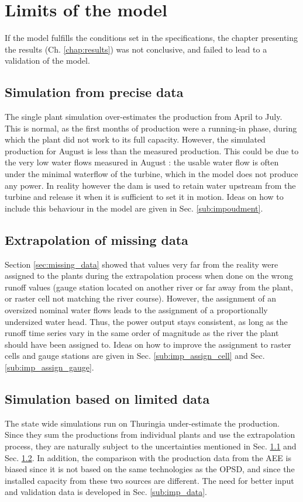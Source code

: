\section{Limits of the model}
\label{sec:limits}
If the model fulfills the conditions set in the specifications, the chapter presenting the results (Ch. \ref{chap:results}) was not conclusive, and failed to lead to a validation of the model.
\subsection{Simulation from precise data}
\label{sub:lim_single}
The single plant simulation over-estimates the production from April to July. This is normal, as the first months of production were a running-in phase, during which the plant did not work to its full capacity. However, the simulated production for August is less than the measured production. This could be due to the very low water flows measured in August : the usable water flow is often under the minimal waterflow of the turbine, which in the model does not produce any power. In reality however the dam is used to retain water upstream from the turbine and release it when it is sufficient to set it in motion. Ideas on how to include this behaviour in the model are given in Sec. \ref{sub:impoudment}.

\subsection{Extrapolation of missing data}
\label{sub:lim_extra}
Section \ref{sec:missing_data} showed that values very far from the reality were assigned to the plants during the extrapolation process when done on the wrong runoff values (gauge station located on another river or far away from the plant, or raster cell not matching the river course). However, the assignment of an oversized nominal water flows leads to the assignment of a proportionally undersized water head. Thus, the power output stays consistent, as long as the runoff time series vary in the same order of magnitude as the river the plant should have been assigned to. Ideas on how to improve the assignment to raster cells and gauge stations are given in Sec. \ref{sub:imp_assign_cell} and Sec. \ref{sub:imp_assign_gauge}.

\subsection{Simulation based on limited data}
\label{sub:lim_data}
The state wide simulations run on Thuringia under-estimate the production. Since they sum the productions from individual plants and use the extrapolation process, they are naturally subject to the uncertainties mentioned in Sec. \ref{sub:lim_single} and Sec. \ref{sub:lim_extra}. In addition, the comparison with the production data from the AEE is biased since it is not based on the same technologies as the OPSD, and since the installed capacity from these two sources are different. The need for better input and validation data is developed in Sec. \ref{sub:imp_data}.

